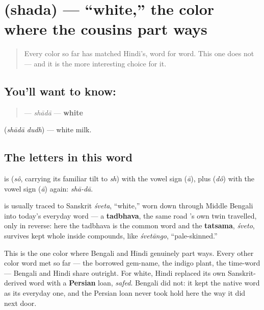 \section[\texorpdfstring{\bn{সাদা} (shada)}{সাদা (shada)}]{ (shada) — \textquotedblleft{}white,\textquotedblright{} the color where the cousins part ways}

\label{lesson:BN-C14-shada}



\begin{quote}
Every color so far has matched Hindi's, word for word. This one does not — and it is the more interesting choice for it.
\end{quote}

\subsection*{You'll want to know: }
\begin{quote}
\textbf{} — \emph{shādā} — \textbf{white}
\end{quote}

  (\emph{shādā dudh}) — white milk.

\subsection*{The letters in this word}
\textbf{} is \textbf{} (\emph{sô}, carrying its familiar tilt to \emph{sh}) with the vowel sign \textbf{} (\emph{ā}), plus \textbf{} (\emph{dô}) with the vowel sign \textbf{} (\emph{ā}) again: \emph{shā-dā}.

\begin{cousinweb}
\textbf{} is usually traced to Sanskrit \emph{śveta}, \textquotedblleft{}white,\textquotedblright{} worn down through Middle Bengali into today's everyday word — a \textbf{tadbhava}, the same road 's own twin travelled, only in reverse: here the tadbhava is the common word and the \textbf{tatsama}, \emph{śveto}, survives kept whole inside compounds, like \emph{śvetāngo}, \textquotedblleft{}pale-skinned.\textquotedblright{}

This is the one color where Bengali and Hindi genuinely part ways. Every other color word met so far — the borrowed gem-name, the indigo plant, the time-word — Bengali and Hindi share outright. For white, Hindi replaced its own Sanskrit-derived word with a \textbf{Persian} loan, \emph{safed}. Bengali did not: it kept the native word as its everyday one, and the Persian loan never took hold here the way it did next door.
\end{cousinweb}

